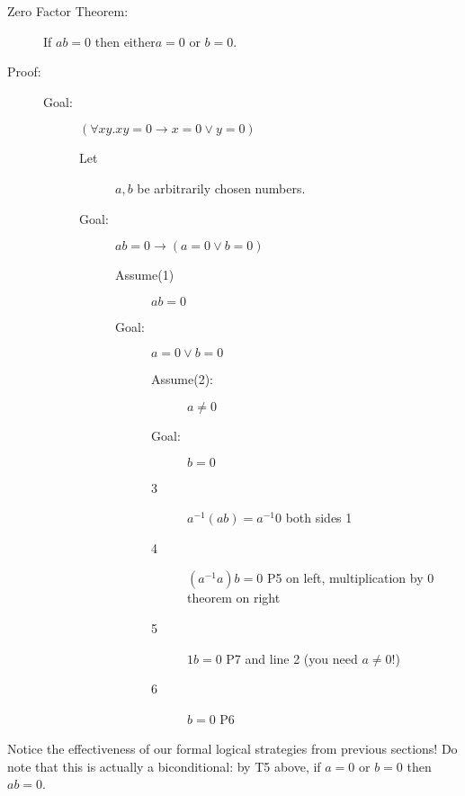 \documentclass[12pt]{article}
\begin{document}
\begin{description}

\item[Zero Factor Theorem:]  If $ab=0$ then either$a=0$ or $b=0$.

\item[Proof:]  

\begin{description}

\item[Goal:]  $(\forall xy.xy=0 \rightarrow x=0 \vee y=0)$

\begin{description}

\item[Let]  $a,b$ be arbitrarily chosen numbers.

\item[Goal:]  $ab=0 \rightarrow (a=0 \vee b=0)$

\begin{description}

\item[Assume(1)]  $ab=0$

\item[Goal:]  $a=0 \vee b=0$

\begin{description}

\item[Assume(2):]  $a\neq 0$

\item[Goal:]  $b=0$

\item[3]  $a^{-1}(ab)=a^{-1}0$  both sides 1

\item[4]  $(a^{-1}a)b =0$  P5 on left, multiplication by 0 theorem on right

\item[5]  $1b=0$  P7 and line 2 (you need $a \neq 0$!)

\item[6]  $b=0$  P6


\end{description}

\end{description}

\end{description}

\end{description}


\end{description}

Notice the effectiveness of our formal logical strategies from previous sections!  Do note that this is actually
a biconditional:  by T5 above, if $a=0$ or $b=0$ then $ab=0$.
\end{document}
